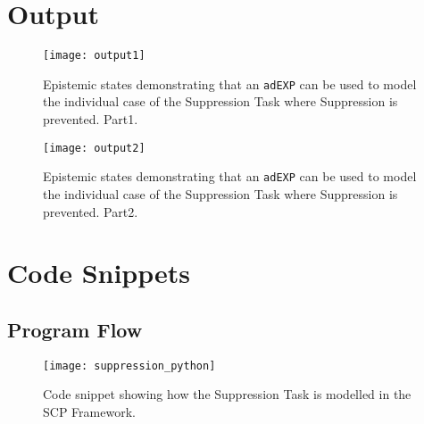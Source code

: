 \section{Output}
\begin{figure}
\centering \texttt{[image: output1]}
\caption{Epistemic states demonstrating that an \texttt{adEXP} can be used to model the individual case of the Suppression Task where Suppression is prevented. Part1.}
\label{fig:suppression_python}
\end{figure}
\begin{figure}
\centering \texttt{[image: output2]}
\caption{Epistemic states demonstrating that an \texttt{adEXP} can be used to model the individual case of the Suppression Task where Suppression is prevented. Part2.}
\label{fig:suppression_python}
\end{figure}

\section{Code Snippets}
\subsection{Program Flow}
\begin{figure}
\centering \texttt{[image: suppression\_python]}
\caption{Code snippet showing how the Suppression Task is modelled in the SCP Framework.}
\label{fig:sup_snippet}
\end{figure}

